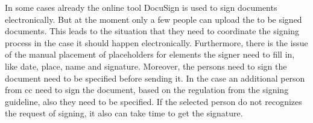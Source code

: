 In some cases already the online tool DocuSign is used to sign documents electronically. But at the moment only a few people can upload the to be signed documents. This leads to the situation that they need to coordinate the signing process in the case it should happen electronically. Furthermore, there is the issue of the manual placement of placeholders for elements the signer need to fill in, like date, place, name and signature. Moreover, the persons need to sign the document need to be specified before sending it. In the case an additional person from \gls{cc} need to sign the document, based on the regulation from the signing guideline, also they need to be specified. If the selected person do not recognizes the request of signing, it also can take time to get the signature.
